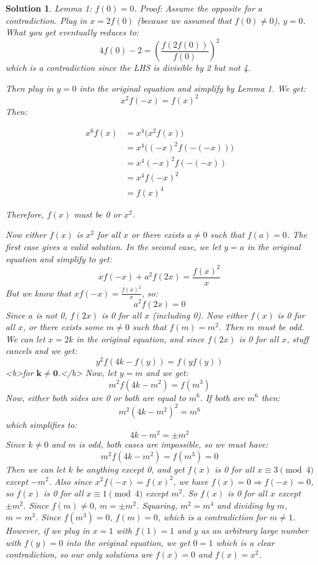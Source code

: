 \documentclass[12pt]{article}
\newtheorem*{solution*}{Solution}
\begin{document}
\begin{solution*}
Lemma 1: $f(0) = 0$.
Proof: Assume the opposite for a contradiction. Plug in $x = 2f(0)$ (because we assumed that $f(0) \neq 0$), $y = 0$. What you get eventually reduces to:
$$4f(0)-2 = \left( \frac{f(2f(0))}{f(0)} \right)^2$$
which is a contradiction since the LHS is divisible by 2 but not 4.

Then plug in $y = 0$ into the original equation and simplify by Lemma 1. We get:
$$x^2f(-x) = f(x)^2$$
Then:

$$\begin{align*}
x^6f(x) &= x^4\bigl(x^2f(x)\bigr)\\
&= x^4\bigl((-x)^2f(-(-x))\bigr)\\
&= x^4(-x)^2f(-(-x))\\
&= x^4f(-x)^2\\
&= f(x)^4
\end{align*}$$

Therefore, $f(x)$ must be 0 or $x^2$.

Now either $f(x)$ is $x^2$ for all $x$ or there exists $a \neq 0$ such that $f(a)=0$. The first case gives a valid solution. In the second case, we let $y = a$ in the original equation and simplify to get:
$$xf(-x) + a^2f(2x) = \frac{f(x)^2}{x}$$
But we know that $xf(-x) = \frac{f(x)^2}{x}$, so:
$$a^2f(2x) = 0$$
Since $a$ is not 0, $f(2x)$ is 0 for all $x$ (including 0). Now either $f(x)$ is 0 for all $x$, or there exists some $m \neq 0$ such that $f(m) = m^2$. Then $m$ must be odd. We can let $x = 2k$ in the original equation, and since $f(2x)$ is 0 for all $x$, stuff cancels and we get:
$$y^2f(4k - f(y)) = f(yf(y))$$
<b>for $\mathbf{k \neq 0}$.</b>
Now, let $y = m$ and we get:
$$m^2f(4k - m^2) = f(m^3)$$
Now, either both sides are 0 or both are equal to $m^6$. If both are $m^6$ then:
$$m^2(4k - m^2)^2 = m^6$$
which simplifies to:
$$4k - m^2 = \pm m^2$$
Since $k \neq 0$ and $m$ is odd, both cases are impossible, so we must have:
$$m^2f(4k - m^2) = f(m^3) = 0$$
Then we can let $k$ be anything except 0, and get $f(x)$ is 0 for all $x \equiv 3 \pmod{4}$ except $-m^2$.  Also since $x^2f(-x) = f(x)^2$, we have $f(x) = 0 \Rightarrow f(-x) = 0$, so $f(x)$ is 0 for all $x \equiv 1 \pmod{4}$ except $m^2$. So $f(x)$ is 0 for all $x$ except $\pm m^2$. Since $f(m) \neq 0$, $m = \pm m^2$. Squaring, $m^2 = m^4$ and dividing by $m$, $m = m^3$. Since $f(m^3) = 0$, $f(m) = 0$, which is a contradiction for $m \neq 1$. However, if we plug in $x = 1$ with $f(1) = 1$ and $y$ as an arbitrary large number with $f(y) = 0$ into the original equation, we get $0 = 1$ which is a clear contradiction, so our only solutions are $f(x) = 0$ and $f(x) = x^2$.

\end{solution*}
\end{document}

